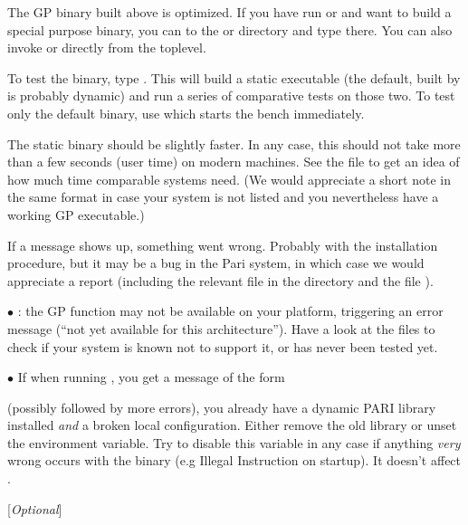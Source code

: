 The GP binary built above is optimized. If you have run  or
 and want to build a special purpose binary, you can  to the
 or  directory and type  there. You can also
invoke  or  directly from the toplevel.


To test the binary, type . This will build a static
executable (the default, built by  is probably dynamic) and
run a series of comparative tests on those two. To test only the default
binary, use  which starts the bench immediately.

The static binary should be slightly faster. In any case, this should not
take more than a few seconds (user time) on modern machines. See the file
 to get an idea of how much time comparable systems need. (We
would appreciate a short note in the same format in case your system is not
listed and you nevertheless have a working GP executable.)

If a \kbd{[BUG]} message shows up, something went wrong. Probably with the
installation procedure, but it may be a bug in the Pari system, in which
case we would appreciate a report (including the relevant  file
in the  directory and the file ).


$\bullet$ : the GP function  may not be available on
your platform, triggering an error message (``not yet available for this
architecture''). Have a look at the  files to check if your
system is known not to support it, or has never been tested yet.

$\bullet$ If when running , you get a message of the form


\noindent (possibly followed by more errors), you already have a dynamic PARI
library installed {\it and\/} a broken local configuration. Either remove the
old library or unset the  environment variable. Try to
disable this variable in any case if anything {\it very} wrong occurs with
the  binary (e.g Illegal Instruction on startup). It doesn't
affect .

 [{\sl Optional\/}]

